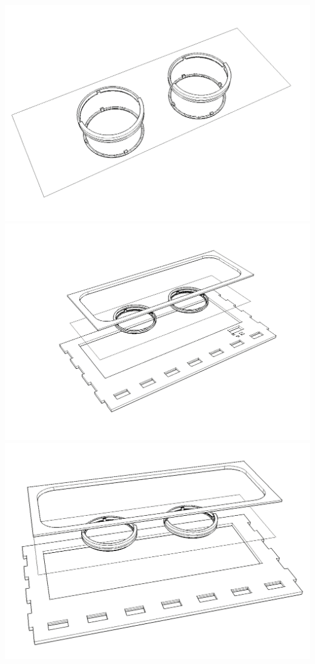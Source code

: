 \documentclass{article}
\begin{document}
\begin{center}
	\includegraphics[width=\hsize]{assembling/step10.png}
	\includegraphics[width=\hsize]{assembling/step11.png}
	\includegraphics[width=\hsize]{assembling/step11_2.png}

\end{center}
\end{document}
